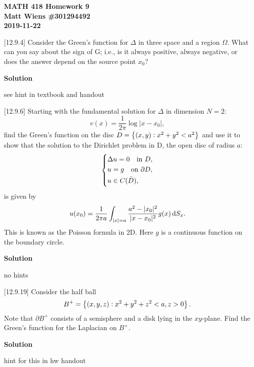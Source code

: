 \documentclass{article}
\begin{document}
\textbf{MATH 418 Homework 9} \\
\textbf{Matt Wiens \#301294492} \\
\textbf{2019-11-22}

[12.9.4] Consider the Green's function for $\Delta$ in three space and a
region $\Omega$. What can you say about the sign of G; i.e., is it
always positive, always negative, or does the answer depend on the
source point $x_0$?

\textbf{Solution}

see hint in textbook and handout

\newpage

[12.9.6] Starting with the fundamental solution for $\Delta$ in
dimension $N = 2$:
%
\begin{equation}
    v(x) = \frac{1}{2 \pi} \log |x - x_0|
    ,
\end{equation}
%
find the Green's function on the disc
$D = \cbr{(x, y): x^2 + y^2 < a^2}$ and use it to show that the solution
to the Dirichlet problem in D, the open disc of radius $a$:
%
\begin{equation*}
    \begin{dcases}
        \Delta u = 0 \quad \text{in } D, \\
        u = g \quad \text{on } \partial D, \\
        u \in C(\bar{D}),
    \end{dcases}
\end{equation*}
%
is given by
%
\begin{equation*}
    u(x_0) = \frac{1}{2 \pi a}
        \int_{|x| = a} \frac{a^2 - |x_0|^2}{|x - x_0|^2} g(x) \dif S_x
        .
\end{equation*}
%
This is known as the Poisson formula in 2D. Here $g$ is a continuous
function on the boundary circle.

\textbf{Solution}

no hints

\newpage

[12.9.19] Consider the half ball
%
\begin{equation*}
    B^+ = \cbr[1]{(x, y, z): x^2 + y^2 + z^2 < a, z > 0}
    .
\end{equation*}
%
Note that $\partial B^+$ consists of a semisphere and a disk lying in
the $x y$-plane. Find the Green's function for the Laplacian on $B^+$.

\textbf{Solution}

hint for this in hw handout
\end{document}
